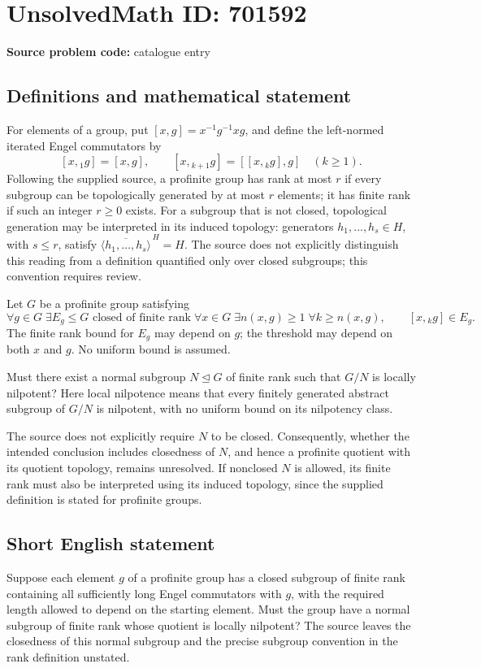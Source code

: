 \documentclass[11pt]{article}
\begin{document}
\section*{UnsolvedMath ID: 701592}
\textbf{Source problem code:} catalogue entry
\subsection{Definitions and mathematical statement}
For elements of a group, put \([x,g]=x^{-1}g^{-1}xg\), and define the left-normed iterated Engel commutators by
\[
[x,{}_1g]=[x,g],\qquad [x,{}_{k+1}g]=[[x,{}_kg],g]\quad(k\geq1).
\]
Following the supplied source, a profinite group has rank at most \(r\) if every subgroup can be topologically generated by at most \(r\) elements; it has finite rank if such an integer \(r\geq0\) exists. For a subgroup that is not closed, topological generation may be interpreted in its induced topology: generators \(h_1,\ldots,h_s\in H\), with \(s\leq r\), satisfy \(\overline{\langle h_1,\ldots,h_s\rangle}^{\,H}=H\). The source does not explicitly distinguish this reading from a definition quantified only over closed subgroups; this convention requires review.

Let \(G\) be a profinite group satisfying
\[
\forall g\in G\;\exists E_g\leq G\text{ closed of finite rank}\;\forall x\in G\;\exists n(x,g)\geq1\;\forall k\geq n(x,g),
\qquad [x,{}_kg]\in E_g.
\]
The finite rank bound for \(E_g\) may depend on \(g\); the threshold may depend on both \(x\) and \(g\). No uniform bound is assumed.

Must there exist a normal subgroup \(N\trianglelefteq G\) of finite rank such that \(G/N\) is locally nilpotent? Here local nilpotence means that every finitely generated abstract subgroup of \(G/N\) is nilpotent, with no uniform bound on its nilpotency class.

The source does not explicitly require \(N\) to be closed. Consequently, whether the intended conclusion includes closedness of \(N\), and hence a profinite quotient with its quotient topology, remains unresolved. If nonclosed \(N\) is allowed, its finite rank must also be interpreted using its induced topology, since the supplied definition is stated for profinite groups.
\subsection{Short English statement}
Suppose each element \(g\) of a profinite group has a closed subgroup of finite rank containing all sufficiently long Engel commutators with \(g\), with the required length allowed to depend on the starting element. Must the group have a normal subgroup of finite rank whose quotient is locally nilpotent? The source leaves the closedness of this normal subgroup and the precise subgroup convention in the rank definition unstated.
\end{document}
